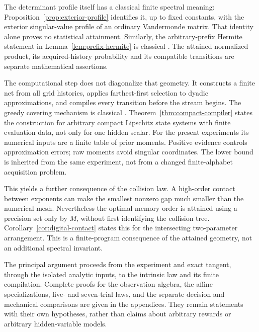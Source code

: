 The determinant profile itself has a classical finite spectral meaning:
Proposition~\ref{prop:exterior-profile} identifies it, up to fixed
constants, with the exterior singular-value profile of an ordinary
Vandermonde matrix. That identity alone proves no statistical attainment.
Similarly, the arbitrary-prefix Hermite statement in
Lemma~\ref{lem:prefix-hermite} is classical \cite[Proposition 7]{deBoor}.
The attained normalized product, its acquired-history probability and
its compatible transitions are separate mathematical assertions.

The computational step does not diagonalize that geometry. It constructs
a finite net from all grid histories, applies farthest-first selection to
dyadic approximations, and compiles every transition before the stream
begins. The greedy covering mechanism is classical \cite{Gonzalez}.
Theorem~\ref{thm:compact-compiler} states the construction for arbitrary
compact Lipschitz state systems with finite evaluation data, not only for
one hidden scalar. For the present experiments its numerical inputs are
a finite table of prior moments. Positive evidence controls approximation
errors; raw moments avoid singular coordinates. The lower bound is
inherited from the same experiment, not from a changed finite-alphabet
acquisition problem.

This yields a further consequence of the collision law. A high-order
contact between exponents can make the smallest nonzero gap much smaller
than the numerical mesh. Nevertheless the optimal memory order is
attained using a precision set only by $M$, without first identifying
the collision tree. Corollary~\ref{cor:digital-contact} states this for
the intersecting two-parameter arrangement. This is a finite-program
consequence of the attained geometry, not an additional spectral invariant.

The principal argument proceeds from the experiment and exact tangent,
through the isolated analytic inputs, to the intrinsic law and its finite
compilation. Complete proofs for the observation algebra, the affine
specializations, five- and seven-trial laws, and the separate decision
and mechanical comparisons are given in the appendices. They remain
statements with their own hypotheses, rather than claims about arbitrary
rewards or arbitrary hidden-variable models.
